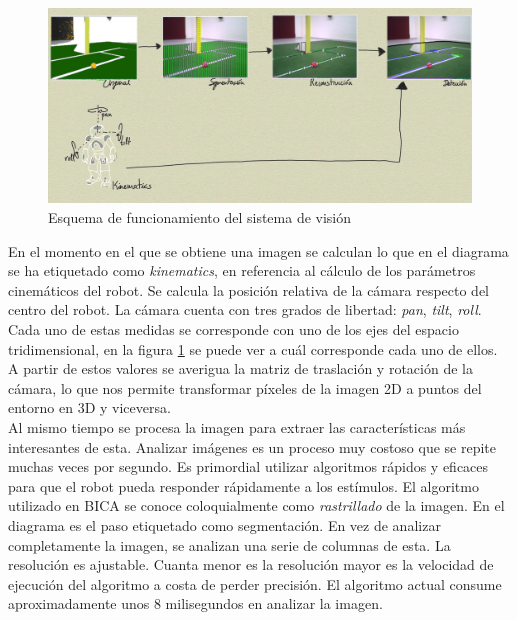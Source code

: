 \begin{figure} [h]
  \begin{center}
    \includegraphics[width=15.5cm]{img/cap3/vision_system_real_images}
  \end{center}
  \caption{Esquema de funcionamiento del sistema de visión}
  \label{fig:visionsystem}
\end{figure}

En el momento en el que se obtiene una imagen se calculan lo que en el diagrama se ha etiquetado como \textit{kinematics}, en referencia al cálculo de los parámetros cinemáticos del robot. Se calcula la posición relativa de la cámara respecto del centro del robot. La cámara cuenta con tres grados de libertad: \textit{pan}, \textit{tilt}, \textit{roll}. Cada uno de estas medidas se corresponde con uno de los ejes del espacio tridimensional, en la figura \ref{fig:visionsystem} se puede ver a cuál corresponde cada uno de ellos. A partir de estos valores se averigua la matriz de traslación y rotación de la cámara, lo que nos permite transformar píxeles de la imagen 2D a puntos del entorno en 3D y viceversa. \\

Al mismo tiempo se procesa la imagen para extraer las características más interesantes de esta. Analizar imágenes es un proceso muy costoso que se repite muchas veces por segundo. Es primordial utilizar algoritmos rápidos y eficaces para que el robot pueda responder rápidamente a los estímulos. El algoritmo utilizado en BICA se conoce coloquialmente como \textit{rastrillado} de la imagen. En el diagrama es el paso etiquetado como segmentación. En vez de analizar completamente la imagen, se analizan una serie de columnas de esta. La resolución es ajustable. Cuanta menor es la resolución mayor es la velocidad de ejecución del algoritmo a costa de perder precisión. El algoritmo actual consume aproximadamente unos 8 milisegundos en analizar la imagen. \\

